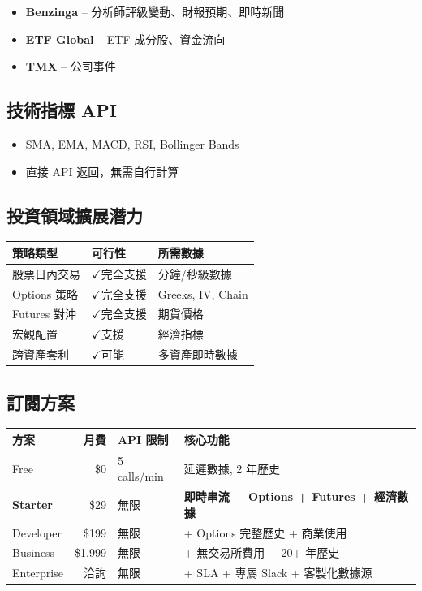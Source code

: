 \documentclass[11pt,a4paper]{article}
\newcommand{\cmark}{\textcolor{successgreen}{$\checkmark$}}
\begin{document}
\begin{tcolorbox}[colback=polygonpurple!5,colframe=polygonpurple,title={Partner Data (合作夥伴數據)}]
\begin{itemize}[leftmargin=*]
    \item \textbf{Benzinga} -- 分析師評級變動、財報預期、即時新聞
    \item \textbf{ETF Global} -- ETF 成分股、資金流向
    \item \textbf{TMX} -- 公司事件
\end{itemize}
\end{tcolorbox}

\subsection{技術指標 API}
\begin{itemize}
    \item SMA, EMA, MACD, RSI, Bollinger Bands
    \item 直接 API 返回，無需自行計算
\end{itemize}

\subsection{投資領域擴展潛力}

\begin{table}[H]
\centering
\begin{tabular}{@{}lll@{}}
\toprule
\textbf{策略類型} & \textbf{可行性} & \textbf{所需數據} \\
\midrule
股票日內交易 & \cmark 完全支援 & 分鐘/秒級數據 \\
Options 策略 & \cmark 完全支援 & Greeks, IV, Chain \\
Futures 對沖 & \cmark 完全支援 & 期貨價格 \\
宏觀配置 & \cmark 支援 & 經濟指標 \\
跨資產套利 & \cmark 可能 & 多資產即時數據 \\
\bottomrule
\end{tabular}
\end{table}

\subsection{訂閱方案}

\begin{table}[H]
\centering
\begin{tabular}{@{}lrll@{}}
\toprule
\textbf{方案} & \textbf{月費} & \textbf{API 限制} & \textbf{核心功能} \\
\midrule
Free & \$0 & 5 calls/min & 延遲數據, 2 年歷史 \\
\textbf{Starter} & \$29 & 無限 & \textbf{即時串流 + Options + Futures + 經濟數據} \\
Developer & \$199 & 無限 & + Options 完整歷史 + 商業使用 \\
Business & \$1,999 & 無限 & + 無交易所費用 + 20+ 年歷史 \\
Enterprise & 洽詢 & 無限 & + SLA + 專屬 Slack + 客製化數據源 \\
\bottomrule
\end{tabular}
\end{table}
\end{document}
